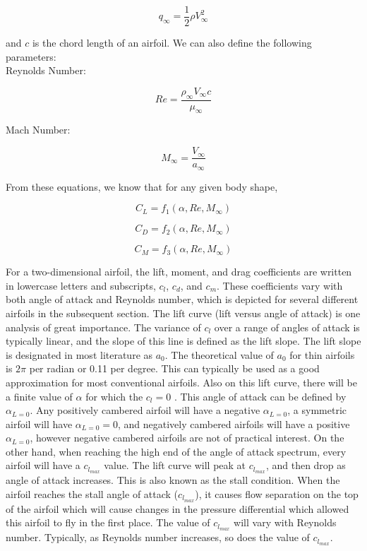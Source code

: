 \documentclass[]{article}
\begin{document}
\begin{equation}
q_{\infty} = \frac{1}{2} \rho V_{\infty}^{2}
\end{equation}

and $c$ is the chord length of an airfoil.  We can also define the following parameters: \\

Reynolds Number:

\begin{equation}
Re = \frac{\rho_{\infty} V_{\infty} c}{\mu_{\infty}}
\end{equation}

Mach Number:

\begin{equation}
M_{\infty} = \frac{V_{\infty}}{a_{\infty}}
\end{equation}

From these equations, we know that for any given body shape, 

\begin{equation}
C_{L} = f_{1} (\alpha, Re, M_{\infty})
\end{equation}

\begin{equation}
C_{D} = f_{2} (\alpha, Re, M_{\infty})
\end{equation}

\begin{equation}
C_{M} = f_{3} (\alpha, Re, M_{\infty})
\end{equation}

For a two-dimensional airfoil, the lift, moment, and drag coefficients are written in lowercase letters and subscripts, $c_{l}$, $c_{d}$, and $c_{m}$.  These coefficients vary with both angle of attack and Reynolds number, which is depicted for several different airfoils in the subsequent section.  The lift curve (lift versus angle of attack) is one analysis of great importance.  The variance of $c_{l}$ over a range of angles of attack is typically linear, and the slope of this line is defined as the lift slope.  The lift slope is designated in most literature as $a_{0}$.  The theoretical value of $a_{0}$ for thin airfoils is $2\pi$ per radian or 0.11 per degree.  This can typically be used as a good approximation for most conventional airfoils.  Also on this lift curve, there will be a finite value of $\alpha$ for which the $c_{l} =0$ .  This angle of attack can be defined by $\alpha_{L=0}$.  Any positively cambered airfoil will have a negative $\alpha_{L=0}$, a symmetric airfoil will have $\alpha_{L=0} = 0$, and negatively cambered airfoils will have a positive $\alpha_{L=0}$, however negative cambered airfoils are not of practical interest.  On the other hand, when reaching the high end of the angle of attack spectrum, every airfoil will have a $c_{l_{max}}$ value.  The lift curve will peak at $c_{l_{max}}$, and then drop as angle of attack increases.  This is also known as the stall condition.  When the airfoil reaches the stall angle of attack ($c_{l_{max}}$), it causes flow separation on the top of the airfoil which will cause changes in the pressure differential which allowed this airfoil to fly in the first place.  The value of $c_{l_{max}}$ will vary with Reynolds number.  Typically, as Reynolds number increases, so does the value of $c_{l_{max}}$.
\end{document}
